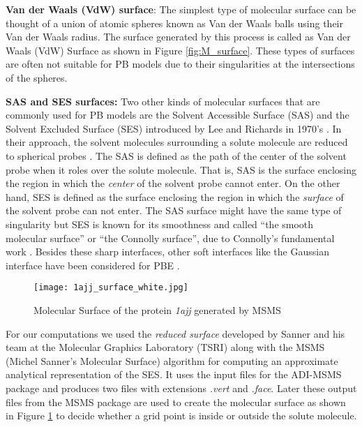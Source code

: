 {\bf Van der Waals (VdW) surface}: The simplest type of molecular surface can be thought of a union of atomic spheres known as Van der Waals balls using their Van der Waals radius. The surface generated by this process is called as Van der Waals (VdW) Surface as shown in Figure \ref{fig:M_surface}. These types of surfaces are often not suitable for PB models due to their singularities at the intersections of the spheres.  

{\bf SAS and SES surfaces:} Two other kinds of molecular surfaces that are commonly used for PB models are the Solvent Accessible Surface (SAS) and the Solvent Excluded Surface (SES) introduced by Lee and Richards in 1970's \cite{LEE1971379,Fred1977}. In their approach, the solvent molecules surrounding a solute molecule are reduced to spherical probes \cite{Tomasi2005}. The SAS is defined as the path of the center of the solvent probe when it roles over the solute molecule. That is, SAS is the surface enclosing the region in which the {\it center} of the solvent probe cannot enter. On the other hand, SES is defined as the surface enclosing the region in which the {\it surface} of the solvent probe can not enter. The SAS surface might have the same type of singularity but SES is known for its smoothness and called “the smooth molecular surface” or “the Connolly surface”, due to Connolly’s fundamental work \cite{Connolly1983}. Besides these sharp interfaces, other soft interfaces like the Gaussian interface have been considered for PBE \cite{Hazra2019}.   
\begin{figure}[!ht]
	\centering
	\texttt{[image: 1ajj\_surface\_white.jpg]}	
	\caption{Molecular Surface of the protein \textit{1ajj} generated by MSMS}
	\label{fig:1ajj_surface}
\end{figure}

For our computations we used the {\it reduced surface} developed by Sanner and his team  \cite{MSMS} at the Molecular Graphics Laboratory (TSRI) along with the MSMS (Michel Sanner’s Molecular Surface) algorithm for computing an approximate analytical representation of the SES. It uses the input files for the ADI-MSMS package and produces two files with extensions {\it .vert} and {\it .face}. Later these output files from the MSMS package are used to create the molecular surface as shown in Figure \ref{fig:1ajj_surface} to decide whether a grid point is inside or outside the solute molecule. 


